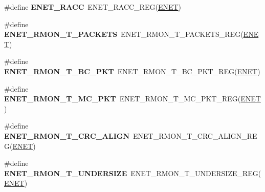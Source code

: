 \begin{DoxyCompactItemize}
\item 
\#define {\bfseries E\+N\+E\+T\+\_\+\+R\+A\+CC}~E\+N\+E\+T\+\_\+\+R\+A\+C\+C\+\_\+\+R\+EG(\hyperlink{group__ENET__Peripheral__Access__Layer_ga4745105f505f3ab949d6a57fbe2a0ed5}{E\+N\+ET})\hypertarget{group__ENET__Register__Accessor__Macros_gab8cef4267c0501acfbe1f6d7e7bbf0c4}{}\label{group__ENET__Register__Accessor__Macros_gab8cef4267c0501acfbe1f6d7e7bbf0c4}

\item 
\#define {\bfseries E\+N\+E\+T\+\_\+\+R\+M\+O\+N\+\_\+\+T\+\_\+\+P\+A\+C\+K\+E\+TS}~E\+N\+E\+T\+\_\+\+R\+M\+O\+N\+\_\+\+T\+\_\+\+P\+A\+C\+K\+E\+T\+S\+\_\+\+R\+EG(\hyperlink{group__ENET__Peripheral__Access__Layer_ga4745105f505f3ab949d6a57fbe2a0ed5}{E\+N\+ET})\hypertarget{group__ENET__Register__Accessor__Macros_gaa86be980a2a0cdfa7133cbba2d02fd4d}{}\label{group__ENET__Register__Accessor__Macros_gaa86be980a2a0cdfa7133cbba2d02fd4d}

\item 
\#define {\bfseries E\+N\+E\+T\+\_\+\+R\+M\+O\+N\+\_\+\+T\+\_\+\+B\+C\+\_\+\+P\+KT}~E\+N\+E\+T\+\_\+\+R\+M\+O\+N\+\_\+\+T\+\_\+\+B\+C\+\_\+\+P\+K\+T\+\_\+\+R\+EG(\hyperlink{group__ENET__Peripheral__Access__Layer_ga4745105f505f3ab949d6a57fbe2a0ed5}{E\+N\+ET})\hypertarget{group__ENET__Register__Accessor__Macros_gadc3115bf35fbd9a601fb7fec5e8518e1}{}\label{group__ENET__Register__Accessor__Macros_gadc3115bf35fbd9a601fb7fec5e8518e1}

\item 
\#define {\bfseries E\+N\+E\+T\+\_\+\+R\+M\+O\+N\+\_\+\+T\+\_\+\+M\+C\+\_\+\+P\+KT}~E\+N\+E\+T\+\_\+\+R\+M\+O\+N\+\_\+\+T\+\_\+\+M\+C\+\_\+\+P\+K\+T\+\_\+\+R\+EG(\hyperlink{group__ENET__Peripheral__Access__Layer_ga4745105f505f3ab949d6a57fbe2a0ed5}{E\+N\+ET})\hypertarget{group__ENET__Register__Accessor__Macros_gab5d1774f09344c97cb14cb81205e0cff}{}\label{group__ENET__Register__Accessor__Macros_gab5d1774f09344c97cb14cb81205e0cff}

\item 
\#define {\bfseries E\+N\+E\+T\+\_\+\+R\+M\+O\+N\+\_\+\+T\+\_\+\+C\+R\+C\+\_\+\+A\+L\+I\+GN}~E\+N\+E\+T\+\_\+\+R\+M\+O\+N\+\_\+\+T\+\_\+\+C\+R\+C\+\_\+\+A\+L\+I\+G\+N\+\_\+\+R\+EG(\hyperlink{group__ENET__Peripheral__Access__Layer_ga4745105f505f3ab949d6a57fbe2a0ed5}{E\+N\+ET})\hypertarget{group__ENET__Register__Accessor__Macros_ga69f8c3aea1ac5b0694446dce0cc4ff6b}{}\label{group__ENET__Register__Accessor__Macros_ga69f8c3aea1ac5b0694446dce0cc4ff6b}

\item 
\#define {\bfseries E\+N\+E\+T\+\_\+\+R\+M\+O\+N\+\_\+\+T\+\_\+\+U\+N\+D\+E\+R\+S\+I\+ZE}~E\+N\+E\+T\+\_\+\+R\+M\+O\+N\+\_\+\+T\+\_\+\+U\+N\+D\+E\+R\+S\+I\+Z\+E\+\_\+\+R\+EG(\hyperlink{group__ENET__Peripheral__Access__Layer_ga4745105f505f3ab949d6a57fbe2a0ed5}{E\+N\+ET})\hypertarget{group__ENET__Register__Accessor__Macros_gac7beffe56548ecad6d37ce6dd73958ff}{}\label{group__ENET__Register__Accessor__Macros_gac7beffe56548ecad6d37ce6dd73958ff}


\end{DoxyCompactItemize}
